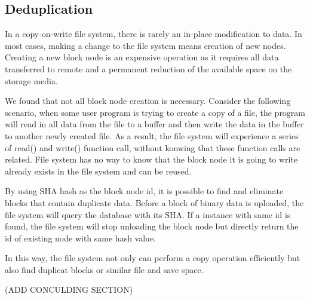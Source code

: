 \subsection{Deduplication}

    In a copy-on-write file system, there is rarely an in-place modification to data. In most cases, making a change to the file system means creation of new nodes. Creating a new block node is an expensive operation as it requires all data transferred to remote and a permanent reduction of the available space on the storage media.
    
    We found that not all block node creation is necessary. Consider the following scenario, when some user program is trying to create a copy of a file, the program will read in all data from the file to a buffer and then write the data in the buffer to another newly created file. As a result, the file system will experience a series of read() and write() function call, without konwing that these function calls are related. File system has no way to know that the block node it is going to write already exists in the file system and can be reused.

    By using SHA hash as the block node id, it is possible to find and eliminate blocks that contain duplicate data. Before a block of binary data is uploaded, the file system will query the database with its SHA. If a instance with same id is found, the file system will stop unloading the block node but directly return the id of existing node with same hash value.

    In this way, the file system not only can perform a copy operation efficiently but also find duplicat blocks or similar file and save space. 

    (ADD CONCULDING SECTION)
